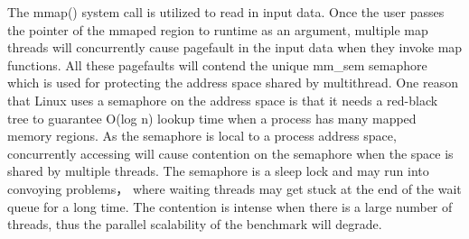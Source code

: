 


The mmap() system call is utilized to read in input data. 
Once the user passes the pointer of the mmaped region to runtime as an argument, 
multiple map threads will concurrently cause pagefault in the input data when they invoke map functions.
All these pagefaults will contend the unique mm\_sem semaphore
which is used for protecting the address space shared by multithread.
One reason that Linux uses a semaphore on the address space is 
that it needs a red-black tree to guarantee O(log n)
lookup time when a process has many mapped memory regions\cite{linux}. 
As the semaphore is local to a process address space,
concurrently accessing will cause contention on the semaphore
when the space is shared by multiple threads.
The semaphore is a sleep lock and may run into convoying problems，
where waiting threads may get stuck at the end of the wait queue for a long time.\cite{Andi2009lmulticore}
The contention is intense when there is a large  number of threads,
thus the parallel scalability of the benchmark will degrade.


